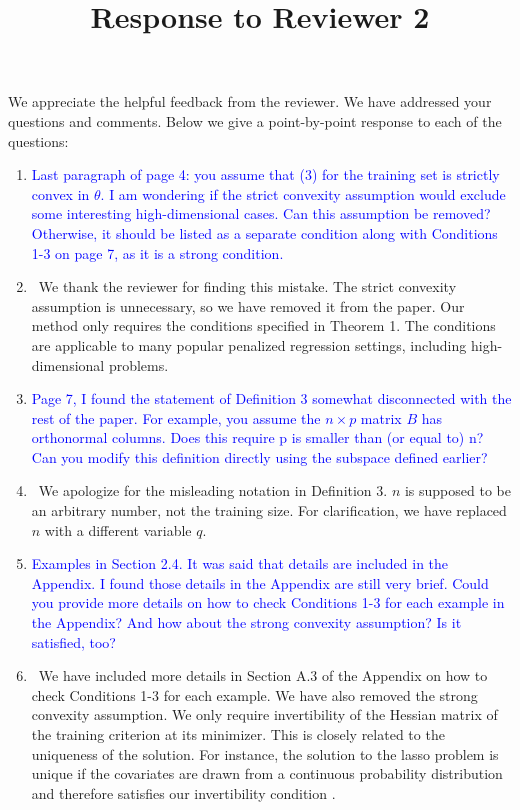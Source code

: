 \documentclass[]{article}
\title{Response to Reviewer 2}
\newcommand{\point}[1]{\item \textcolor{blue}{#1}}
\newcommand{\reply}{\item[]\ }
\begin{document}
	\maketitle
		
	We appreciate the helpful feedback from the reviewer. We have addressed your questions and comments. Below we give a point-by-point response to each of the questions:
		
	\begin{enumerate}
		\point{Last paragraph of page 4: you assume that (3) for the training set is strictly convex in $\theta$. I am wondering if the strict convexity assumption would exclude some interesting high-dimensional cases. Can this assumption be removed? Otherwise, it should be listed as a separate condition along with Conditions 1-3 on page 7, as it is a strong condition.}
		
		\reply We thank the reviewer for finding this mistake. The strict convexity assumption is unnecessary, so we have removed it from the paper. Our method only requires the conditions specified in Theorem 1. The conditions are applicable to many popular penalized regression settings, including high-dimensional problems.
		
		\point{Page 7, I found the statement of Definition 3 somewhat disconnected with the rest of the paper. For example, you assume the $n\times p$ matrix $B$ has orthonormal columns. Does this require p is smaller than (or equal to) n? Can you modify this definition directly using the subspace defined earlier?}
		
		\reply We apologize for the misleading notation in Definition 3. $n$ is supposed to be an arbitrary number, not the training size. For clarification, we have replaced $n$ with a different variable $q$. 
		
		
		\point{Examples in Section 2.4. It was said that details are included in the Appendix. I found those details in the Appendix are still very brief. Could you provide more details on how to check Conditions 1-3 for each example in the Appendix? And how about the strong convexity assumption? Is it satisfied, too?}
		
		\reply We have included more details in Section A.3 of the Appendix on how to check Conditions 1-3 for each example. We have also removed the strong convexity assumption. We only require invertibility of the Hessian matrix of the training criterion at its minimizer. This is closely related to the uniqueness of the solution. For instance, the solution to the lasso problem is unique if the covariates are drawn from a continuous probability distribution and therefore satisfies our invertibility condition \citep{tibshirani2013lasso}.
		

\end{enumerate}
\end{document}
